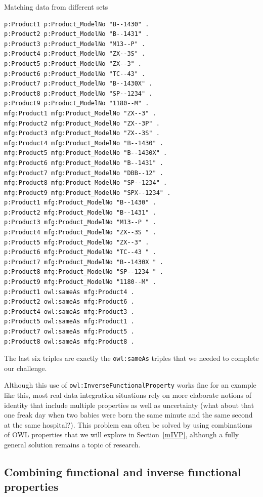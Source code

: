 \begin{challenge}{Matching data from different sets}
\begin{lstlisting}
p:Product1 p:Product_ModelNo "B--1430" .
p:Product2 p:Product_ModelNo "B--1431" .
p:Product3 p:Product_ModelNo "M13--P" .
p:Product4 p:Product_ModelNo "ZX--3S" .
p:Product5 p:Product_ModelNo "ZX--3" .
p:Product6 p:Product_ModelNo "TC--43" .
p:Product7 p:Product_ModelNo "B--1430X" .
p:Product8 p:Product_ModelNo "SP--1234" .
p:Product9 p:Product_ModelNo "1180--M" .
mfg:Product1 mfg:Product_ModelNo "ZX--3" .
mfg:Product2 mfg:Product_ModelNo "ZX--3P" .
mfg:Product3 mfg:Product_ModelNo "ZX--3S" .
mfg:Product4 mfg:Product_ModelNo "B--1430" .
mfg:Product5 mfg:Product_ModelNo "B--1430X" .
mfg:Product6 mfg:Product_ModelNo "B--1431" .
mfg:Product7 mfg:Product_ModelNo "DBB--12" .
mfg:Product8 mfg:Product_ModelNo "SP--1234" .
mfg:Product9 mfg:Product_ModelNo "SPX--1234" .
p:Product1 mfg:Product_ModelNo "B--1430" .
p:Product2 mfg:Product_ModelNo "B--1431" .
p:Product3 mfg:Product_ModelNo "M13--P " .
p:Product4 mfg:Product_ModelNo "ZX--3S " .
p:Product5 mfg:Product_ModelNo "ZX--3" .
p:Product6 mfg:Product_ModelNo "TC--43 " .
p:Product7 mfg:Product_ModelNo "B--1430X " .
p:Product8 mfg:Product_ModelNo "SP--1234 " .
p:Product9 mfg:Product_ModelNo "1180--M" .
p:Product1 owl:sameAs mfg:Product4 .
p:Product2 owl:sameAs mfg:Product6 .
p:Product4 owl:sameAs mfg:Product3 .
p:Product5 owl:sameAs mfg:Product1 .
p:Product7 owl:sameAs mfg:Product5 .
p:Product8 owl:sameAs mfg:Product8 .
\end{lstlisting}  

The last six triples are exactly the \texttt{owl:sameAs} triples that we needed
to complete our challenge.

\end{challenge}

Although this use of \texttt{owl:InverseFunctionalProperty} works fine for an
example like this, most real data integration situations rely on more
elaborate notions of identity that include multiple properties as well
as uncertainty (what about that one freak day when two babies were born
the same minute and the same second at the same hospital?). This problem
can often be solved by using combinations of OWL properties that we will
explore in Section~\ref{mIVP}, although a fully general solution remains a
topic of research.

\subsection{Combining functional and inverse functional properties}

